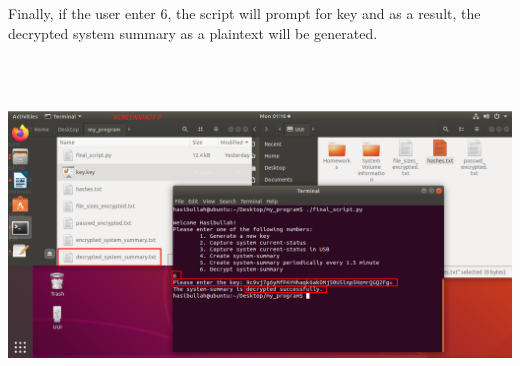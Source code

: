 \documentclass{article} %
\begin{document}
\noindent 

\noindent \newline\newline\newline \newline\newline\newline \newline\newline\newline \newline\newline\newline \newline\newline\newline\newline \newline\newline\newline\newline\newline\newline\newline\newline Finally, if the user enter 6, the script will prompt for key and as a result, the decrypted system summary as a plaintext will be generated.

\noindent \includegraphics*[width=6in, height=3.70in, keepaspectratio=false]{7.png}

\noindent 
\end{document}
